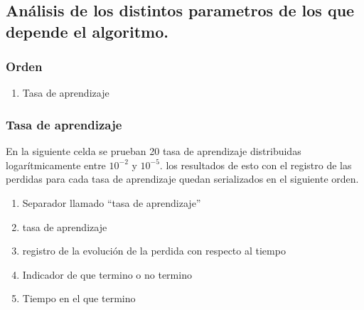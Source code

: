 \documentclass[11pt]{article}
\providecommand{\tightlist}{%
      \setlength{\itemsep}{0pt}\setlength{\parskip}{0pt}}
\begin{document}
    \hypertarget{anuxe1lisis-de-los-distintos-parametros-de-los-que-depende-el-algoritmo.}{%
\subsection{Análisis de los distintos parametros de los que depende el
algoritmo.}\label{anuxe1lisis-de-los-distintos-parametros-de-los-que-depende-el-algoritmo.}}

\hypertarget{orden}{%
\subsubsection{Orden}\label{orden}}

\begin{enumerate}
\def\labelenumi{\arabic{enumi}.}
\tightlist
\item
  Tasa de aprendizaje
\end{enumerate}

    \hypertarget{tasa-de-aprendizaje}{%
\subsubsection{Tasa de aprendizaje}\label{tasa-de-aprendizaje}}

En la siguiente celda se prueban 20 tasa de aprendizaje distribuidas
logarítmicamente entre \(10^{-2}\) y \(10^{-5}\). los resultados de esto
con el registro de las perdidas para cada tasa de aprendizaje quedan
serializados en el siguiente orden.

\begin{enumerate}
\def\labelenumi{\arabic{enumi}.}
\tightlist
\item
  Separador llamado ``tasa de aprendizaje''
\item
  tasa de aprendizaje
\item
  registro de la evolución de la perdida con respecto al tiempo
\item
  Indicador de que termino o no termino
\item
  Tiempo en el que termino
\end{enumerate}
\end{document}

